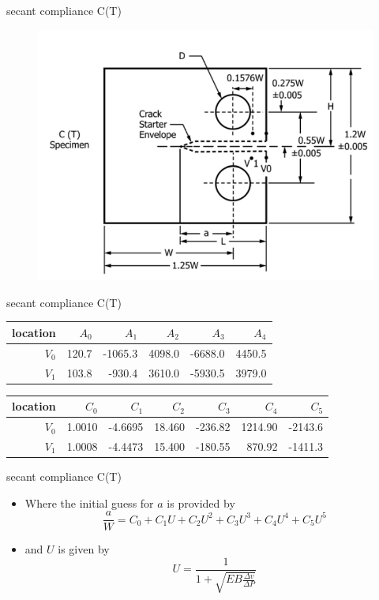 \documentclass[10pt]{beamer}
\begin{document}
\begin{frame}{secant compliance C(T)}
	\begin{figure}
		\centering
		\includegraphics[width=0.7\linewidth]{CT-KR}
		\label{fig:CT-KR}
	\end{figure}
\end{frame}

\begin{frame}{secant compliance C(T)}
	\begin{tabular}{rrrrrr}
		location	& $A_0$ & $A_1$ & $A_2$ & $A_3$ & $A_4$ \\ 
		\hline
		$V_0$	& 120.7 & -1065.3 & 4098.0 & -6688.0 & 4450.5 \\ 
		$V_1$	& 103.8 & -930.4 & 3610.0 & -5930.5 & 3979.0
	\end{tabular} 
	\begin{tabular}{rrrrrrr}
		location	& $C_0$ & $C_1$ & $C_2$ & $C_3$ & $C_4$ & $C_5$ \\ 
		\hline
		$V_0$	& 1.0010 & -4.6695 & 18.460 & -236.82 & 1214.90 & -2143.6\\ 
		$V_1$	& 1.0008 & -4.4473 & 15.400 & -180.55 & 870.92 & -1411.3
	\end{tabular} 
\end{frame}

\begin{frame}{secant compliance C(T)}
	\begin{itemize}
		\item Where the initial guess for $a$ is provided by
		\begin{equation}
		\frac{a}{W} = C_0 + C_1 U + C_2 U^2 + C_3 U^3 + C_4 U^4 + C_5 U^5
		\end{equation}
		\item and $U$ is given by
		\begin{equation}
		U = \frac{1}{1 + \sqrt{EB\frac{\Delta v}{\Delta P}}}
		\end{equation}
	\end{itemize}
\end{frame}
\end{document}
